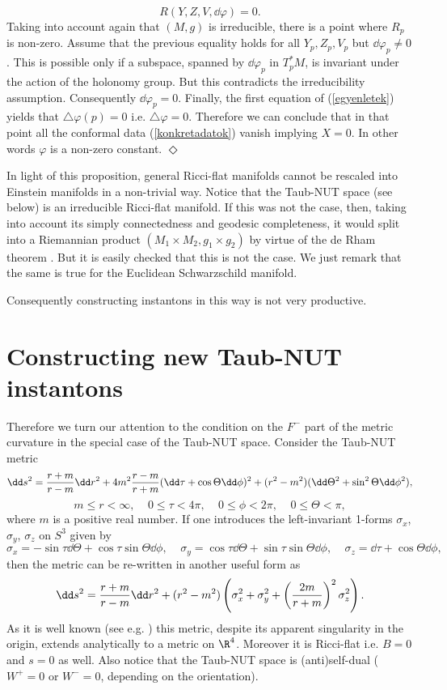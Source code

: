 \documentclass[a4paper,12pt,draft]{article}
\begin{document}
\[R(Y,Z,V, \dd\varphi )=0.\]
Taking into account again that $(M,g)$ is irreducible, there is a point
where $R_p$ is non-zero. Assume that the previous equality holds for all
$Y_p,Z_p,V_p$ but $\dd\varphi_p\not=0$. This is possible only if a
subspace, spanned by $\dd\varphi_p$ in $T^*_pM$, is invariant under the
action of the holonomy group. But this contradicts the irreducibility
assumption. Consequently $\dd\varphi_p=0$. Finally, the first equation of
(\ref{egyenletek}) yields that $\triangle\varphi (p)=0$ 
i.e. $\triangle\varphi =0$. Therefore we can conclude that in that
point all the conformal data (\ref{konkretadatok}) vanish implying $X=0$.
In other words $\varphi$ is a non-zero constant. $\Diamond$
\vspace{0.1in}

\noindent In light of this proposition, general Ricci-flat 
manifolds cannot be rescaled into Einstein manifolds in a non-trivial
way. Notice that the Taub-NUT space (see below) is
an irreducible Ricci-flat manifold. If this was not the
case, then, taking into account its simply connectedness and geodesic
completeness, it would split into a Riemannian product 
$(M_1\times M_2, g_1\times g_2)$ by virtue of the de Rham theorem
\cite{deR}. But it is easily checked that this is not the case. We just
remark that the same is true for the Euclidean Schwarzschild manifold. 

Consequently constructing instantons in this way is not very
productive. 

\section{Constructing new Taub-NUT instantons}
Therefore we turn our attention to the condition on the $F^-$ part of
the metric curvature in the special case of the Taub-NUT space. Consider 
the Taub-NUT metric
\begin{equation}
\dd s^2={r+m\over r-m}\dd r^2+4m^2{r-m\over r+m}(\dd\tau
+\cos\Theta\dd\phi
)^2+(r^2-m^2)(\dd\Theta^2+\sin^2\Theta\dd\phi^2),
\label{taub}
\end{equation}
\[m\leq r<\infty ,\:\:\:\:\:0\leq\tau <4\pi ,\:\:\:\:\:0\leq\phi <2\pi
,\:\:\:\:\:0\leq\Theta <\pi ,\]
where $m$ is a positive real number. If one introduces the  left-invariant
1-forms $\sigma_x$, $\sigma_y$, $\sigma_z$ on $S^3$ given by
\[\sigma_x=-\sin\tau\dd\Theta
+\cos\tau\sin\Theta\dd\phi ,\:\:\:\:\:\sigma_y=\cos\tau\dd\Theta
+\sin\tau\sin\Theta\dd\phi ,\:\:\:\:\:\sigma_z=\dd\tau +\cos\Theta\dd\phi
,\]
then the metric can be re-written in another useful form as
\[\dd s^2={r+m\over r-m}\dd r^2+(r^2-m^2)\left( \sigma_x^2+\sigma_y^2+
\left( {2m\over r+m} \right)^2 \sigma_z^2\right).\]
As it is well known (see e.g. \cite{pop}) this metric, despite its 
apparent singularity in the origin, extends analytically to a metric on
$\R^4$. Moreover it is Ricci-flat i.e. $B=0$ and $s=0$ as
well. Also notice that the Taub-NUT space is (anti)self-dual ($W^+=0$ or
$W^-=0$, depending on the orientation).
\end{document}
